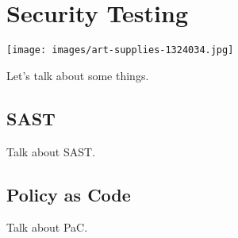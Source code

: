\chapter{Security Testing}

\texttt{[image: images/art-supplies-1324034.jpg]}

Let's talk about some things. 

\section{SAST}

\justifying
Talk about SAST.

\section{Policy as Code}

\justifying
Talk about PaC.
